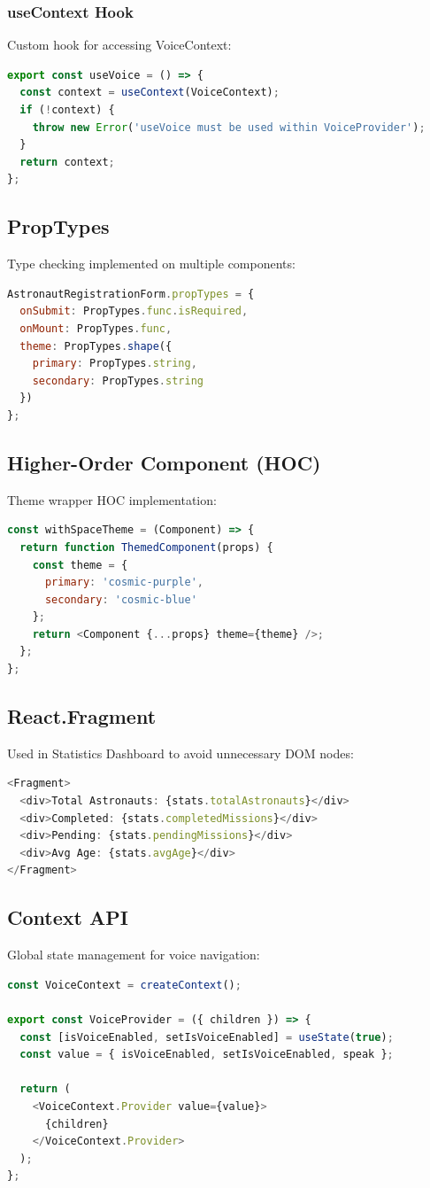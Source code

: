 \documentclass[12pt,a4paper]{article}
\begin{document}
\subsubsection{useContext Hook}
Custom hook for accessing VoiceContext:
\begin{lstlisting}[language=JavaScript]
export const useVoice = () => {
  const context = useContext(VoiceContext);
  if (!context) {
    throw new Error('useVoice must be used within VoiceProvider');
  }
  return context;
};
\end{lstlisting}

\subsection{PropTypes}
Type checking implemented on multiple components:
\begin{lstlisting}[language=JavaScript]
AstronautRegistrationForm.propTypes = {
  onSubmit: PropTypes.func.isRequired,
  onMount: PropTypes.func,
  theme: PropTypes.shape({
    primary: PropTypes.string,
    secondary: PropTypes.string
  })
};
\end{lstlisting}

\subsection{Higher-Order Component (HOC)}
Theme wrapper HOC implementation:
\begin{lstlisting}[language=JavaScript]
const withSpaceTheme = (Component) => {
  return function ThemedComponent(props) {
    const theme = {
      primary: 'cosmic-purple',
      secondary: 'cosmic-blue'
    };
    return <Component {...props} theme={theme} />;
  };
};
\end{lstlisting}

\subsection{React.Fragment}
Used in Statistics Dashboard to avoid unnecessary DOM nodes:
\begin{lstlisting}[language=JavaScript]
<Fragment>
  <div>Total Astronauts: {stats.totalAstronauts}</div>
  <div>Completed: {stats.completedMissions}</div>
  <div>Pending: {stats.pendingMissions}</div>
  <div>Avg Age: {stats.avgAge}</div>
</Fragment>
\end{lstlisting}

\subsection{Context API}
Global state management for voice navigation:
\begin{lstlisting}[language=JavaScript]
const VoiceContext = createContext();

export const VoiceProvider = ({ children }) => {
  const [isVoiceEnabled, setIsVoiceEnabled] = useState(true);
  const value = { isVoiceEnabled, setIsVoiceEnabled, speak };
  
  return (
    <VoiceContext.Provider value={value}>
      {children}
    </VoiceContext.Provider>
  );
};
\end{lstlisting}
\end{document}
